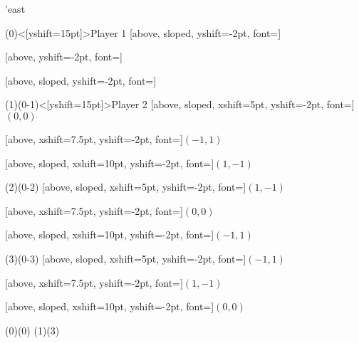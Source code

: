 

\begin{istgame}[font=\small]
    \setistgrowdirection'{east}



    \xtdistance{40mm}{22.5mm}

    \istroot(0)<[yshift=15pt]>{Player 1}
        [above, sloped, yshift=-2pt, font=\scriptsize]
        
        [above, yshift=-2pt, font=\scriptsize]
        
        [above, sloped, yshift=-2pt, font=\scriptsize]
    \endist



    \xtdistance{40mm}{7.5mm}
    
    \istroot(1)(0-1)<[yshift=15pt]>{Player 2}
        [above, sloped, xshift=5pt, yshift=-2pt, font=\scriptsize]{$(0, 0)$}
        
        [above, xshift=7.5pt, yshift=-2pt, font=\scriptsize]{$(-1, 1)$}
        
        [above, sloped, xshift=10pt, yshift=-2pt, font=\scriptsize]{$(1, -1)$}
    \endist

    \istroot(2)(0-2){}
        [above, sloped, xshift=5pt, yshift=-2pt, font=\scriptsize]{$(1, -1)$}
        
        [above, xshift=7.5pt, yshift=-2pt, font=\scriptsize]{$(0, 0)$}
        
        [above, sloped, xshift=10pt, yshift=-2pt, font=\scriptsize]{$(-1, 1)$}
    \endist

    \istroot(3)(0-3){}
        [above, sloped, xshift=5pt, yshift=-2pt, font=\scriptsize]{$(-1, 1)$}
        
        [above, xshift=7.5pt, yshift=-2pt, font=\scriptsize]{$(1, -1)$}
        
        [above, sloped, xshift=10pt, yshift=-2pt, font=\scriptsize]{$(0, 0)$}
    \endist

    \xtInfosetO[fill=color2!25](0)(0) %
    \xtInfosetO[fill=color4!25](1)(3) %

\end{istgame}